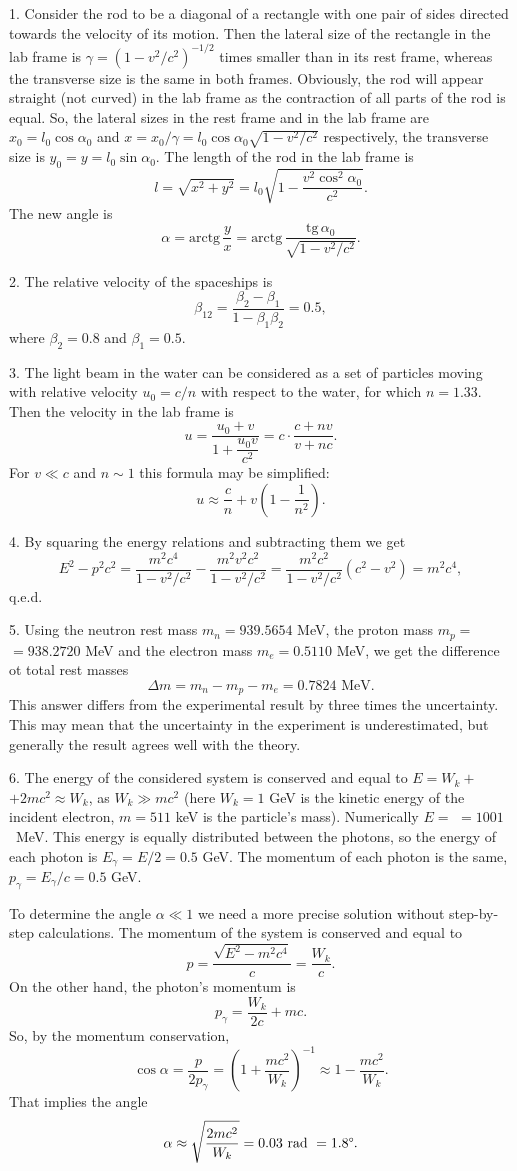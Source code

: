 \documentclass[14pt,a4paper,pdflatex]{disser}
\begin{document}
1. Consider the rod to be a diagonal of a rectangle with one pair of sides directed towards the velocity of its motion. Then the lateral size of the rectangle in the lab frame is $\gamma=\left(1-v^2/c^2\right)^{-1/2}$ times smaller than in its rest frame, whereas the transverse size is the same in both frames. Obviously, the rod will appear straight (not curved) in the lab frame as the contraction of all parts of the rod is equal. So, the lateral sizes in the rest frame and in the lab frame are $x_0=l_0\cos\alpha_0$ and $x=x_0/\gamma=l_0\cos\alpha_0 \sqrt{1-v^2/c^2}$ respectively, the transverse size is $y_0=y=l_0\sin\alpha_0$. The length of the rod in the lab frame is
$$
  l=\sqrt{x^2+y^2}=l_0\sqrt{1-\frac{v^2 \cos^2 \alpha_0}{c^2}}.
$$
The new angle is
$$
  \alpha=\text{arctg}\,\frac{y}{x}=\text{arctg}\,\frac{\text{tg}\,\alpha_0}{\sqrt{1-v^2/c^2}}.
$$

2. The relative velocity of the spaceships is
$$
  \beta_{12}=\frac{\beta_2-\beta_1}{1-\beta_1 \beta_2}=0.5,
$$
where $\beta_2=0.8$ and $\beta_1=0.5$.

3. The light beam in the water can be considered as a set of particles moving with relative velocity $u_0=c/n$ with respect to the water, for which $n=1.33$. Then the velocity in the lab frame is
$$
  u=\frac{u_0+v}{1+\dfrac{u_0 v}{c^2}}=c\cdot\frac{c+nv}{v+nc}.
$$
For $v\ll c$ and $n\sim 1$ this formula may be simplified:
$$
  u\approx \frac{c}{n}+v\left(1-\frac{1}{n^2}\right).
$$

4. By squaring the energy relations and subtracting them we get
$$
  E^2-p^2 c^2=\frac{m^2 c^4}{1-v^2/c^2}-\frac{m^2 v^2 c^2}{1-v^2/c^2}=\frac{m^2 c^2}{1-v^2/c^2}\left(c^2-v^2\right)=m^2 c^4,
$$
q.e.d.

5. Using the neutron rest mass $m_n=939.5654$ MeV, the proton mass ${m_p=}$ ${=938.2720}$ MeV and the electron mass $m_e=0.5110$ MeV, we get the difference ot total rest masses
$$
  \Delta m=m_n-m_p-m_e=0.7824 \text{ MeV}.
$$
This answer differs from the experimental result by three times the uncertainty. This may mean that the uncertainty in the experiment is underestimated, but generally the result agrees well with the theory.

6. The energy of the considered system is conserved and equal to ${E=W_k+}$ ${+2mc^2\approx W_k}$, as $W_k\gg mc^2$ (here $W_k=1$ GeV is the kinetic energy of the incident electron, $m=511$ keV is the particle's mass). Numerically ${E=}$ ${=1001}$~MeV. This energy is equally distributed between the photons, so the energy of each photon is ${E_\gamma=E/2=0.5}$ GeV. The momentum of each photon is the same, $p_\gamma=E_\gamma/c=0.5$ GeV.

To determine the angle $\alpha\ll 1$ we need a more precise solution without step-by-step calculations. The momentum of the system is conserved and equal to
$$
  p=\frac{\sqrt{E^2-m^2 c^4}}{c}=\frac{W_k}{c}.
$$
On the other hand, the photon's momentum is
$$
  p_\gamma=\frac{W_k}{2c}+mc.
$$
So, by the momentum conservation,
$$
  \cos\alpha=\frac{p}{2p_\gamma}=\left(1+\frac{mc^2}{W_k}\right)^{-1}\approx 1-\frac{mc^2}{W_k}.
$$
That implies the angle
$$
  \alpha\approx\sqrt{\frac{2mc^2}{W_k}}=0.03 \text{ rad }=1.8\degree.
$$
\end{document}
